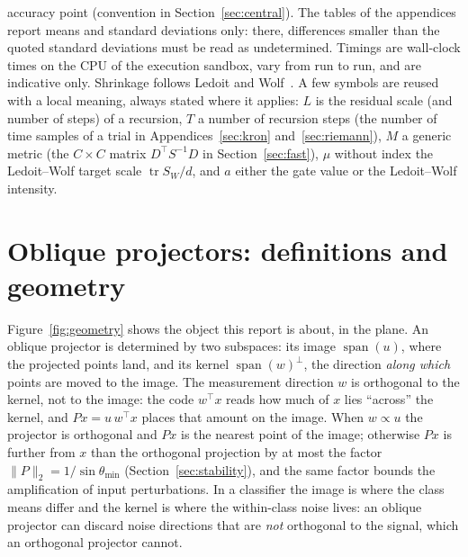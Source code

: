 \documentclass[11pt,a4paper]{article}
\theoremstyle{plain}
\theoremstyle{definition}
\theoremstyle{remark}
\newcommand{\tr}{\operatorname{tr}}
\newcommand{\spn}{\operatorname{span}}
\newcommand{\T}{\top}
\begin{document}
accuracy point (convention in Section~\ref{sec:central}). The tables of the
appendices report means and standard deviations only: there, differences
smaller than the quoted standard deviations must be read as undetermined. Timings are wall-clock times on the CPU of the execution sandbox, vary
from run to run, and are indicative only. Shrinkage follows Ledoit and
Wolf~\cite{ledoitwolf2004}. A few symbols are reused with a local meaning,
always stated where it applies: $L$ is the residual scale (and number of
steps) of a recursion, $T$ a number of recursion steps (the number of time
samples of a trial in Appendices~\ref{sec:kron} and~\ref{sec:riemann}), $M$ a
generic metric (the $C\times C$ matrix $D^\T S^{-1}D$ in
Section~\ref{sec:fast}), $\mu$ without index the Ledoit--Wolf target scale
$\tr S_W/d$, and $a$ either the gate value or the Ledoit--Wolf intensity.

\section{Oblique projectors: definitions and geometry}
\label{sec:prelim}
Figure~\ref{fig:geometry} shows the object this report is about, in the
plane. An oblique projector is determined by two subspaces: its image
$\spn(u)$, where the projected points land, and its kernel $\spn(w)^\perp$,
the direction \emph{along which} points are moved to the image. The
measurement direction $w$ is orthogonal to the kernel, not to the image: the
code $w^\T x$ reads how much of $x$ lies ``across'' the kernel, and $Px=u\,w^\T x$
places that amount on the image. When $w\propto u$ the projector is
orthogonal and $Px$ is the nearest point of the image; otherwise $Px$ is
further from $x$ than the orthogonal projection by at most the factor
$\|P\|_2=1/\sin\theta_{\min}$ (Section~\ref{sec:stability}), and the same
factor bounds the amplification of input perturbations. In a classifier the
image is where the class means differ and the kernel is where the
within-class noise lives: an oblique projector can discard noise directions
that are \emph{not} orthogonal to the signal, which an orthogonal projector
cannot.
\end{document}
